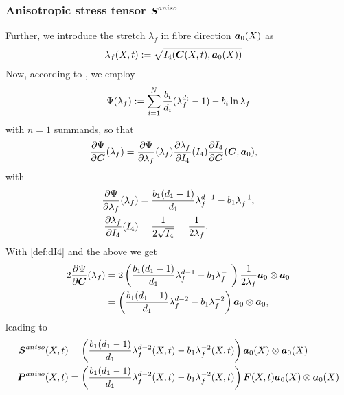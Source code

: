 \subsubsection{Anisotropic stress tensor $\boldsymbol{S}^{aniso}$}
Further, we introduce the stretch $\lambda_f$ in fibre direction $\boldsymbol{a}_0(X)$ as
\begin{align*}
	\lambda_f(X,t) &:= \sqrt{I_4(\boldsymbol{C}(X,t),\boldsymbol{a}_0(X))}
\end{align*}
Now, according to \cite{Markert2005}, we employ
\begin{align*}
	\Psi(\lambda_f) := \sum\limits_{i=1}^{N} \frac{b_i}{d_i}(\lambda_f^{d_i} - 1) - b_i\ln\lambda_f
\end{align*}
with $n=1$ summands, so that
\begin{align}
	\frac{\partial \Psi}{\partial \boldsymbol{C}}(\lambda_f) &= \frac{\partial \Psi}{\partial \lambda_f}(\lambda_f)\frac{\partial \lambda_f}{\partial I_4}(I_4)\frac{\partial I_4}{\partial \boldsymbol{C}}(\boldsymbol{C},\boldsymbol{a}_0),\label{eq:dpsidC}
\end{align}
with
\begin{align*}
		 \frac{\partial \Psi}{\partial \lambda_f}(\lambda_f) &= \frac{b_1(d_1-1)}{d_1}\lambda_f^{d-1} - b_1\lambda_f^{-1},\\
		 \frac{\partial \lambda_f}{\partial I_4}(I_4) &= \frac{1}{2\sqrt{I_4}} = \frac{1}{2\lambda_f}.
\end{align*}
With \eqref{def:dI4} and the above we get
\begin{align*}
	2\frac{\partial \Psi}{\partial \boldsymbol{C}}(\lambda_f) &= 2\left(\frac{b_1(d_1-1)}{d_1}\lambda_f^{d-1} - b_1\lambda_f^{-1}\right) \frac{1}{2\lambda_f}\boldsymbol{a}_0\otimes\boldsymbol{a}_0\\
	&= \left(\frac{b_1(d_1-1)}{d_1}\lambda_f^{d-2} - b_1\lambda_f^{-2}\right) \boldsymbol{a}_0\otimes\boldsymbol{a}_0,
\end{align*}
leading to
\begin{align}
	\boldsymbol{S}^{aniso}(X,t) &= \left(\frac{b_1(d_1-1)}{d_1}\lambda_f^{d-2}(X,t) - b_1\lambda_f^{-2}(X,t)\right) \boldsymbol{a}_0(X)\otimes\boldsymbol{a}_0(X)\\
	\boldsymbol{P}^{aniso}(X,t) &= \left(\frac{b_1(d_1-1)}{d_1}\lambda_f^{d-2}(X,t) - b_1\lambda_f^{-2}(X,t)\right) \boldsymbol{F}(X,t)\boldsymbol{a}_0(X)\otimes\boldsymbol{a}_0(X)
\end{align}

